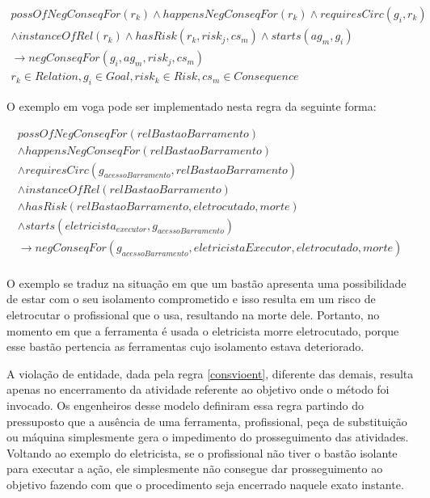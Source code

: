 \begin{eqnarray}\label{paybutiamnotguilty}
	possOfNegConseqFor(r_k) \wedge  happensNegConseqFor(r_k) \wedge requiresCirc(g_i,r_k) \nonumber \\ 
	\wedge instanceOfRel(r_k) \wedge hasRisk(r_k,risk_j,cs_m) \wedge starts(ag_m,g_i) \nonumber \\ 
	\to negConseqFor(g_i,ag_m,risk_j,cs_m) \nonumber \\ 
    r_k \in Relation, g_i \in Goal, risk_k \in Risk, cs_m \in Consequence
\end{eqnarray}

O exemplo em voga pode ser implementado nesta regra da seguinte forma: 

\begin{eqnarray}\nonumber
   possOfNegConseqFor(relBastaoBarramento) \nonumber \\
    \wedge happensNegConseqFor(relBastaoBarramento) \nonumber \\ 
    \wedge requiresCirc(g_{acessoBarramento},relBastaoBarramento) \nonumber \\  
    \wedge instanceOfRel(relBastaoBarramento) \nonumber \\ 
    \wedge hasRisk(relBastaoBarramento,eletrocutado,morte) \nonumber \\  
    \wedge starts(eletricista_{executor},g_{acessoBarramento}) \nonumber \\ 
    \to negConseqFor(g_{acessoBarramento},eletricistaExecutor,eletrocutado,morte) \\ \nonumber
\end{eqnarray}

O exemplo se traduz na situação em que um bastão apresenta uma possibilidade de estar com o seu isolamento comprometido e isso resulta em um risco de eletrocutar o profissional que o usa, resultando na morte dele. Portanto, no momento em que a ferramenta é usada o eletricista morre eletrocutado, porque esse bastão pertencia as ferramentas cujo isolamento estava deteriorado. 

A violação de entidade, dada pela regra \ref{consvioent}, diferente das demais, resulta apenas no encerramento da atividade referente ao objetivo onde o método foi invocado. Os engenheiros desse modelo definiram essa regra partindo do pressuposto que a ausência de uma ferramenta, profissional, peça de substituição ou máquina simplesmente gera o impedimento do prosseguimento das atividades. Voltando ao exemplo do eletricista, se o profissional não tiver o bastão isolante para executar a ação, ele simplesmente não consegue dar prosseguimento ao objetivo fazendo com que o procedimento seja encerrado naquele exato instante. 

